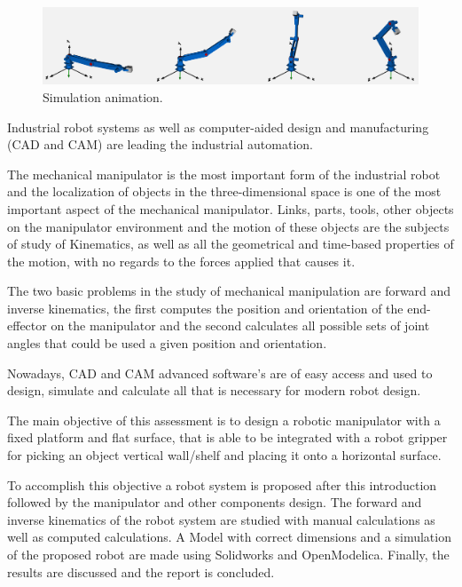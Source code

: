 \documentclass[transmag]{IEEEtran}
\begin{document}
\begin{figure}
\centerline{\includegraphics[width=7in]{./images/SimulationAnimation}}
\caption{Simulation animation.\label{SimulationAnimation}}
\end{figure}














Industrial robot systems as well as computer-aided design and manufacturing (CAD and CAM) are leading the industrial automation. \cite{ref1}

The mechanical manipulator is the most important form of the industrial robot and the localization of objects in the three-dimensional space is one of the most important aspect of the mechanical manipulator. Links, parts, tools, other objects on the manipulator environment and the motion of these objects are the subjects of study of Kinematics,  as well as all the geometrical and time-based properties of the motion, with no regards to the forces applied that causes it.

The two basic problems in the study of mechanical manipulation are forward and inverse kinematics, the first computes the position and orientation of the end-effector on the manipulator and the second calculates all possible sets of joint angles that could be used  a given position and orientation. 

Nowadays, CAD and CAM advanced software's are of easy access and used to design, simulate and calculate all that is necessary for modern robot design.

The main objective of this assessment is to design a robotic manipulator with a fixed platform and flat surface, that is able to be integrated with a robot gripper for picking an object vertical wall/shelf and placing it onto a horizontal surface. 

To accomplish this objective a robot system is proposed after this introduction followed by the manipulator and other components design. The forward and inverse kinematics of the robot system are studied with manual calculations as well as computed calculations. A Model with correct dimensions and a simulation of the proposed robot are made using Solidworks and OpenModelica. Finally, the results are discussed and the report is concluded.
\end{document}
